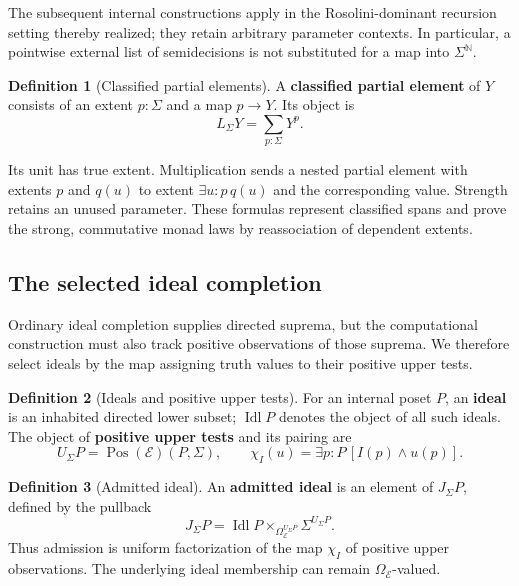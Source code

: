 \documentclass[11pt,a4paper]{article}
\numberwithin{algorithm}{section}
\numberwithin{equation}{section}
\theoremstyle{definition}
\newtheorem{definition}[definition]{Definition}
\theoremstyle{remark}
\theoremstyle{plain}
\newcommand{\E}{\mathcal E}
\newcommand{\Truth}{\Omega_{\E}}
\newcommand{\N}{\mathbb N}
\newcommand{\Idl}{\operatorname{Idl}}
\newcommand{\J}{J_{\Sigma}}
\newcommand{\LL}{L_{\Sigma}}
\newcommand{\Pos}{\operatorname{Pos}}
\theoremstyle{definition}
\theoremstyle{plain}
\begin{document}
The subsequent internal constructions apply in the Rosolini-dominant
recursion setting thereby realized; they retain arbitrary parameter
contexts. In particular, a pointwise external list of semidecisions
is not substituted for a map into $\Sigma^\N$.


\begin{definition}[Classified partial elements]\label{def:partial-elements}
A \textbf{classified partial element} of $Y$ consists of an extent
$p:\Sigma$ and a map $p\to Y$. Its object is \citep{EscardoKnapp2017}
\begin{equation}\label{eq:standalone-lift}
 \LL Y=\sum_{p:\Sigma}Y^p.
\end{equation}
\end{definition}


Its unit has true extent. Multiplication sends a nested partial element
with extents $p$ and $q(u)$ to extent $\exists u:p\,q(u)$ and the
corresponding value. Strength retains an unused parameter. These
formulas represent classified spans and prove the strong, commutative
monad laws by reassociation of dependent extents.

\subsection{The selected ideal completion}
Ordinary ideal completion supplies directed suprema, but the computational
construction must also track positive observations of those suprema.
We therefore select ideals by the map assigning truth values to their
positive upper tests. 

\begin{definition}[Ideals and positive upper tests]\label{def:ideals-upper-tests}
For an internal poset $P$, an \textbf{ideal} is an inhabited directed lower
subset; $\Idl P$ denotes the object of all such ideals. The object of \textbf{positive upper tests} and its pairing are
\[
 U_\Sigma P=\Pos(\E)(P,\Sigma),\qquad
 \chi_I(u)=\exists p:P\,[I(p)\wedge u(p)].
\]
\end{definition}


\begin{definition}[Admitted ideal]\label{def:standalone-admission}
An \textbf{admitted ideal} is an element of $\J P$, defined by the pullback
\[
 \J P=\Idl P\times_{\Truth^{U_\Sigma P}}\Sigma^{U_\Sigma P}.
\]
Thus admission is uniform factorization of the map $\chi_I$ of positive
upper observations. The underlying ideal membership can remain
$\Truth$-valued.
\end{definition}
\end{document}
